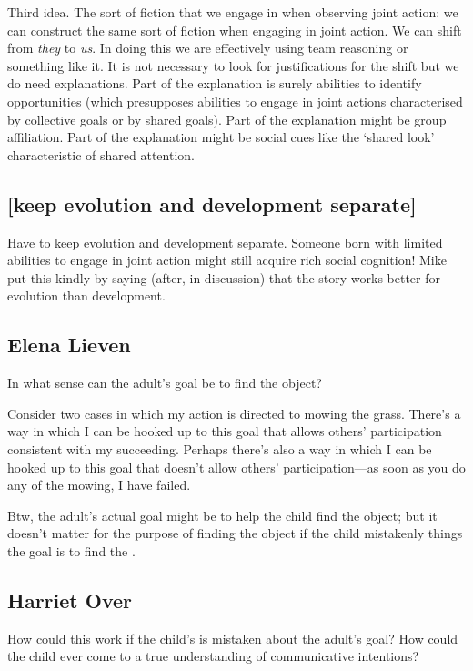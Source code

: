 \documentclass[14pt,a4paper]{extarticle}
\begin{document}
Third idea.  The sort of fiction that we engage in when observing joint action: we can construct the same sort of fiction when engaging in joint action.  We can shift from \emph{they} to \emph{us}.  In doing this we are effectively using team reasoning or something like it.  It is not necessary to look for justifications for the shift but we do need explanations.  Part of the explanation is surely abilities to identify opportunities (which presupposes abilities to engage in joint actions characterised by collective goals or by shared goals).  Part of the explanation might be group affiliation.  Part of the explanation might be social cues like the `shared look' characteristic of shared attention.



\subsection{[keep evolution and development separate]}
Have to keep evolution and development separate.  Someone born with limited abilities to engage in joint action might still acquire rich social cognition!  Mike put this kindly by saying (after, in discussion) that the story works better for evolution than development.


\subsection{Elena Lieven}
In what sense can the adult's goal be to find the object?  

Consider two cases in which my action is directed to mowing the grass.  There's a way in which I can be hooked up to this goal that allows others' participation consistent with my succeeding.  Perhaps there's also a way in which I can be hooked up to this goal that doesn't allow others' participation---as soon as you do any of the mowing, I have failed.

Btw, the adult's actual goal might be to help the child find the object; but it doesn't matter for the purpose of finding the object if the child mistakenly things the goal is to find the .


\subsection{Harriet Over}

How could this work if the child's is mistaken about the adult's goal?  How could the child ever come to a true understanding of communicative intentions?
\end{document}
